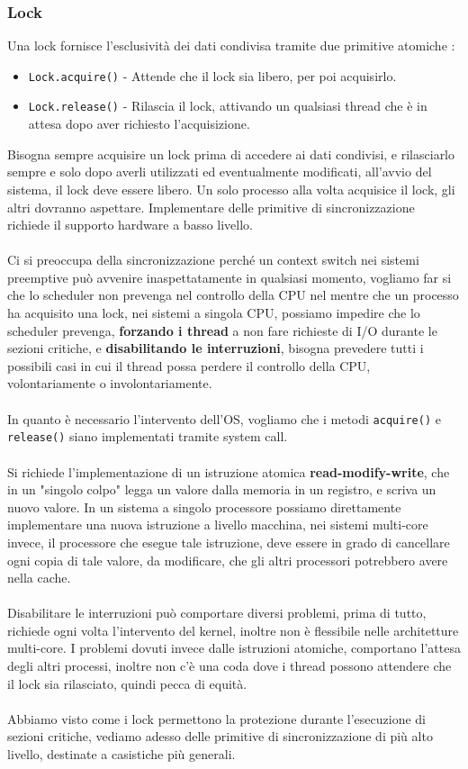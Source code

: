 \documentclass[12pt, letterpaper]{article}
\newcommand{\code}[1]{\colorbox{light-gray}{\texttt{#1}}}
\newcommand{\acc}{\\\hphantom{}\\}
\begin{document}
\subsubsection{Lock}
Una lock fornisce l'esclusività dei dati condivisa tramite due primitive atomiche : \begin{itemize}
    \item \code{Lock.acquire()} - Attende che il lock sia libero, per poi acquisirlo.
    \item \code{Lock.release()} - Rilascia il lock, attivando un qualsiasi thread che è in attesa dopo aver richiesto 
    l'acquisizione.
\end{itemize}
Bisogna sempre acquisire un lock prima di accedere ai dati condivisi, e rilasciarlo sempre e solo dopo averli utilizzati 
ed eventualmente modificati, all'avvio del sistema, il lock deve essere libero. Un solo processo alla volta acquisice il lock, 
gli altri dovranno aspettare. Implementare delle primitive di sincronizzazione richiede il supporto hardware 
a basso livello.\acc 
Ci si preoccupa della sincronizzazione perché un context switch nei sistemi preemptive può avvenire 
inaspettatamente in qualsiasi momento, vogliamo far si che lo scheduler non prevenga nel controllo della CPU nel mentre 
che un processo ha acquisito una lock, nei sistemi a singola CPU, possiamo impedire che lo scheduler prevenga, 
\textbf{forzando i thread} a non fare richieste di I/O durante le sezioni critiche, e 
\textbf{disabilitando le interruzioni}, bisogna prevedere tutti i possibili casi in cui il thread possa perdere 
il controllo della CPU, volontariamente o involontariamente.\acc 
In quanto è necessario l'intervento dell'OS, vogliamo che i metodi \code{acquire()} e \code{release()} 
siano implementati tramite system call.\acc 
Si richiede l'implementazione di un istruzione atomica \textbf{read-modify-write}, che in un "singolo colpo" legga un valore 
dalla memoria in un registro, e scriva un nuovo valore. In un sistema a singolo processore possiamo direttamente implementare 
una nuova istruzione a livello macchina, nei sistemi multi-core invece, il processore che esegue tale istruzione, deve 
essere in grado di cancellare ogni copia di tale valore, da modificare, che gli altri processori potrebbero avere nella cache.
\acc Disabilitare le interruzioni può comportare diversi problemi, prima di tutto, richiede ogni volta l'intervento 
del kernel, inoltre non è flessibile nelle architetture multi-core.  I problemi dovuti invece dalle istruzioni atomiche, 
comportano l'attesa degli altri processi, inoltre non c'è una coda dove i thread possono attendere che il lock sia 
rilasciato, quindi pecca di equità. \acc Abbiamo visto come i lock permettono la protezione durante l'esecuzione 
di sezioni critiche, vediamo adesso delle primitive di sincronizzazione di più alto livello, destinate 
a casistiche più generali. 
\end{document}

